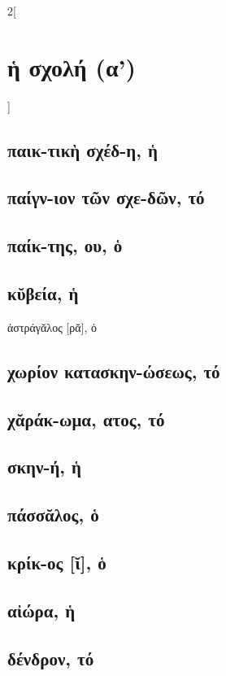 \documentclass{book}
\begin{document}
\begin{multicols}{2}[\section{ἡ σχολή (α')}]
\subsection{παικ-τικὴ σχέδ-η, ἡ}
\subsection{παίγν-ιον τῶν σχε-δῶν, τό}
\subsection{παίκ-της, ου, ὁ}
\subsection{κῠβεία, ἡ}
ἀστράγᾰλος [ρᾰ], ὁ 
\subsection{χωρίον κατασκην-ώσεως, τό}
\subsection{χᾰράκ-ωμα, ατος, τό}
\subsection{σκην-ή, ἡ}
\subsection{πάσσᾰλος, ὁ}
\subsection{κρίκ-ος [ῐ], ὁ}
\subsection{αἰώρα, ἡ}
\subsection{δένδρον, τό}
~
\end{multicols}
\newpage
\end{document}
